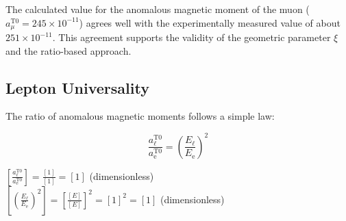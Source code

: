 \documentclass[12pt,a4paper]{article}
\newcommand{\ee}{\text{$\mathrm{e}$}}
\newcommand{\mmu}{\text{$\mu$}}
\theoremstyle{definition}
\begin{document}
	The calculated value for the anomalous magnetic moment of the muon ($a_{\mmu}^{\text{T0}} = 245 \times 10^{-11}$) agrees well with the experimentally measured value of about $251 \times 10^{-11}$. This agreement supports the validity of the geometric parameter $\xi$ and the ratio-based approach.
	
	\subsection{Lepton Universality}
	
	The ratio of anomalous magnetic moments follows a simple law:
	
	\begin{equation}
		\frac{a_{\ell}^{\text{T0}}}{a_{\ee}^{\text{T0}}} = \left(\frac{E_{\ell}}{E_{\ee}}\right)^2
	\end{equation}
	
	\begin{einheitencheck}
		$\left[\frac{a_{\ell}^{\text{T0}}}{a_{\ee}^{\text{T0}}}\right] = \frac{[1]}{[1]} = [1]$ (dimensionless)\\
		$\left[\left(\frac{E_{\ell}}{E_{\ee}}\right)^2\right] = \left[\frac{[E]}{[E]}\right]^2 = [1]^2 = [1]$ (dimensionless) \checkmark
	\end{einheitencheck}
	
\end{document}
